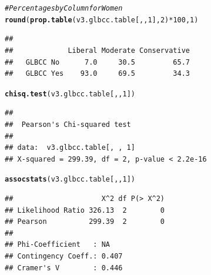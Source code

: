\documentclass[11pt,openany]{book}\usepackage[]{graphicx}\usepackage[]{color}
\makeatletter
\newcommand{\hlnum}[1]{\textcolor[rgb]{0.686,0.059,0.569}{#1}}%
\newcommand{\hlcom}[1]{\textcolor[rgb]{0.678,0.584,0.686}{\textit{#1}}}%
\newcommand{\hlopt}[1]{\textcolor[rgb]{0,0,0}{#1}}%
\newcommand{\hlstd}[1]{\textcolor[rgb]{0.345,0.345,0.345}{#1}}%
\newcommand{\hlkwd}[1]{\textcolor[rgb]{0.737,0.353,0.396}{\textbf{#1}}}%
\newenvironment{kframe}{%
 \def\at@end@of@kframe{}%
 \ifinner\ifhmode%
  \def\at@end@of@kframe{\end{minipage}}%
  \begin{minipage}{\columnwidth}%
 \fi\fi%
 \def\FrameCommand##1{\hskip\@totalleftmargin \hskip-\fboxsep
 \colorbox{shadecolor}{##1}\hskip-\fboxsep
     \hskip-\linewidth \hskip-\@totalleftmargin \hskip\columnwidth}%
 \MakeFramed {\advance\hsize-\width
   \@totalleftmargin\z@ \linewidth\hsize
   \@setminipage}}%
 {\par\unskip\endMakeFramed%
 \at@end@of@kframe}
\newenvironment{knitrout}{}{} %
\renewenvironment{knitrout}{\begin{singlespace}}{\end{singlespace}}
\makeatother
\begin{document}
\begin{knitrout}
\color{fgcolor}\begin{kframe}
\begin{alltt}
\hlcom{# Percentages by Column for Women}
\hlkwd{round}\hlstd{(}\hlkwd{prop.table}\hlstd{(v3.glbcc.table[, ,} \hlnum{1}\hlstd{],} \hlnum{2}\hlstd{)} \hlopt{*} \hlnum{100}\hlstd{,} \hlnum{1}\hlstd{)}
\end{alltt}
\begin{verbatim}
##            
##             Liberal Moderate Conservative
##   GLBCC No      7.0     30.5         65.7
##   GLBCC Yes    93.0     69.5         34.3
\end{verbatim}
\begin{alltt}
\hlkwd{chisq.test}\hlstd{(v3.glbcc.table[, ,} \hlnum{1}\hlstd{])}
\end{alltt}
\begin{verbatim}
## 
## 	Pearson's Chi-squared test
## 
## data:  v3.glbcc.table[, , 1]
## X-squared = 299.39, df = 2, p-value < 2.2e-16
\end{verbatim}
\begin{alltt}
\hlkwd{assocstats}\hlstd{(v3.glbcc.table[, ,} \hlnum{1}\hlstd{])}
\end{alltt}
\begin{verbatim}
##                     X^2 df P(> X^2)
## Likelihood Ratio 326.13  2        0
## Pearson          299.39  2        0
## 
## Phi-Coefficient   : NA 
## Contingency Coeff.: 0.407 
## Cramer's V        : 0.446
\end{verbatim}
\end{kframe}
\end{knitrout}
\end{document}
